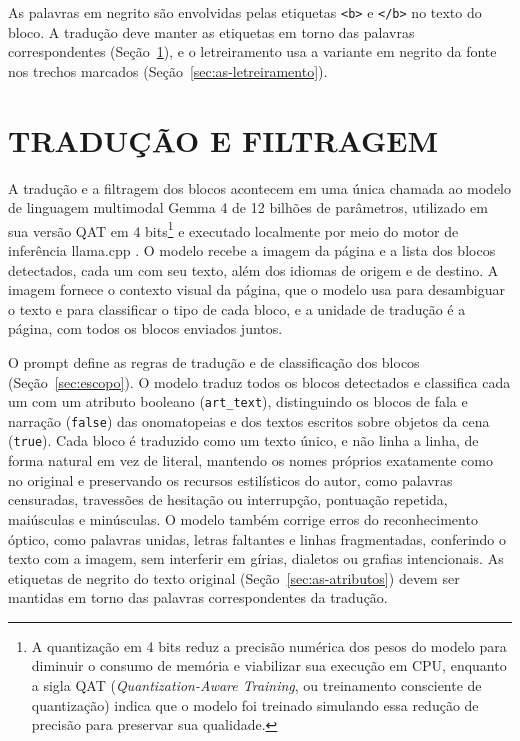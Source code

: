 \documentclass[
    12pt,
    openright,
    oneside,
    a4paper,
    chapter=TITLE,
    section=TITLE,
    english,
    brazilian,
    brazil
]{abntex2}
\begin{document}
As palavras em negrito são envolvidas pelas etiquetas \texttt{<b>} e \texttt{</b>} no texto do bloco. A tradução deve manter as etiquetas em torno das palavras correspondentes (Seção~\ref{sec:as-traducao}), e o letreiramento usa a variante em negrito da fonte nos trechos marcados (Seção~\ref{sec:as-letreiramento}).

\section{TRADUÇÃO E FILTRAGEM}
\label{sec:as-traducao}

A tradução e a filtragem dos blocos acontecem em uma única chamada ao modelo de linguagem multimodal Gemma 4 de 12 bilhões de parâmetros, utilizado em sua versão QAT em 4 bits\footnote{A quantização em 4 bits reduz a precisão numérica dos pesos do modelo para diminuir o consumo de memória e viabilizar sua execução em CPU, enquanto a sigla QAT (\textit{Quantization-Aware Training}, ou treinamento consciente de quantização) indica que o modelo foi treinado simulando essa redução de precisão para preservar sua qualidade.} \cite{gemmateam2026gemma4} e executado localmente por meio do motor de inferência llama.cpp \cite{llamacpp}. O modelo recebe a imagem da página e a lista dos blocos detectados, cada um com seu texto, além dos idiomas de origem e de destino. A imagem fornece o contexto visual da página, que o modelo usa para desambiguar o texto e para classificar o tipo de cada bloco, e a unidade de tradução é a página, com todos os blocos enviados juntos.

O prompt define as regras de tradução e de classificação dos blocos (Seção~\ref{sec:escopo}). O modelo traduz todos os blocos detectados e classifica cada um com um atributo booleano (\texttt{art\_text}), distinguindo os blocos de fala e narração (\texttt{false}) das onomatopeias e dos textos escritos sobre objetos da cena (\texttt{true}). Cada bloco é traduzido como um texto único, e não linha a linha, de forma natural em vez de literal, mantendo os nomes próprios exatamente como no original e preservando os recursos estilísticos do autor, como palavras censuradas, travessões de hesitação ou interrupção, pontuação repetida, maiúsculas e minúsculas. O modelo também corrige erros do reconhecimento óptico, como palavras unidas, letras faltantes e linhas fragmentadas, conferindo o texto com a imagem, sem interferir em gírias, dialetos ou grafias intencionais. As etiquetas de negrito do texto original (Seção~\ref{sec:as-atributos}) devem ser mantidas em torno das palavras correspondentes da tradução.
\end{document}
